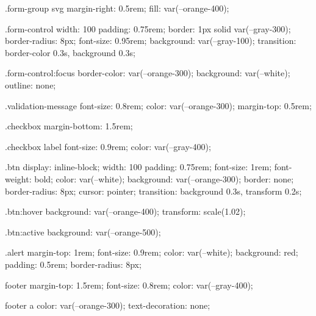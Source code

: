         .form-group svg {
            margin-right: 0.5rem;
            fill: var(--orange-400);
        }

        .form-control {
            width: 100%
            padding: 0.75rem;
            border: 1px solid var(--gray-300);
            border-radius: 8px;
            font-size: 0.95rem;
            background: var(--gray-100);
            transition: border-color 0.3s, background 0.3s;
        }

        .form-control:focus {
            border-color: var(--orange-300);
            background: var(--white);
            outline: none;
        }

        .validation-message {
            font-size: 0.8rem;
            color: var(--orange-300);
            margin-top: 0.5rem;
        }

        .checkbox {
            margin-bottom: 1.5rem;
        }

        .checkbox label {
            font-size: 0.9rem;
            color: var(--gray-400);
        }

        .btn {
            display: inline-block;
            width: 100%
            padding: 0.75rem;
            font-size: 1rem;
            font-weight: bold;
            color: var(--white);
            background: var(--orange-300);
            border: none;
            border-radius: 8px;
            cursor: pointer;
            transition: background 0.3s, transform 0.2s;
        }

        .btn:hover {
            background: var(--orange-400);
            transform: scale(1.02);
        }

        .btn:active {
            background: var(--orange-500);
        }

        .alert {
            margin-top: 1rem;
            font-size: 0.9rem;
            color: var(--white);
            background: red;
            padding: 0.5rem;
            border-radius: 8px;
        }

        footer {
            margin-top: 1.5rem;
            font-size: 0.8rem;
            color: var(--gray-400);
        }

        footer a {
            color: var(--orange-300);
            text-decoration: none;
        }

